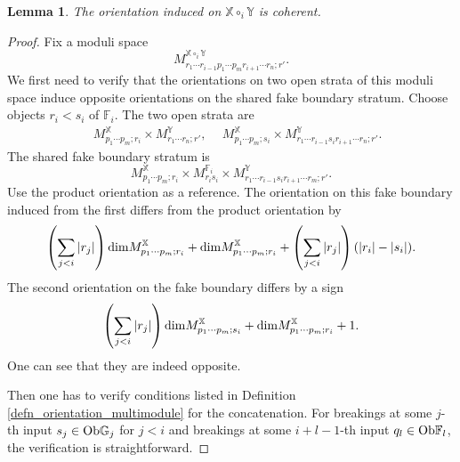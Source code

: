 \documentclass[reqno, 10pt]{amsart}
\numberwithin{equation}{section}
\numberwithin{equation}{section}
\newtheorem{lemma}[thm]{Lemma}
\theoremstyle{definition}
\theoremstyle{remark}
\newcommand{\beqn}{\begin{equation*}}
\newcommand{\eeqn}{\end{equation*}}
\newcommand{\mb}{\mathbb}
\begin{document}
\begin{lemma}\label{lemma_concatenation_orientation}
The orientation induced on ${\mb X}\circ_i {\mb Y}$ is coherent.
\end{lemma}

\begin{proof}
Fix a moduli space
\beqn
M_{r_1 \cdots r_{i-1} p_1 \cdots p_m r_{i+1} \cdots r_n; r'}^{{\mb X}\circ_i {\mb Y}}.
\eeqn
We first need to verify that the orientations on two open strata of this moduli space induce opposite orientations on the shared fake boundary stratum. Choose objects $r_i < s_i$ of ${\mb F}_i$. The two open strata are
\begin{align}
&\ M_{p_1 \cdots p_m; r_i}^{\mb X}\times M_{r_1 \cdots r_n; r'}^{\mb Y},\ &\ M_{p_1 \cdots p_m; s_i}^{\mb X}\times M_{r_1 \cdots r_{i-1} s_i r_{i+1} \cdots r_n; r'}^{\mb Y}.
\end{align}
The shared fake boundary stratum is 
\beqn
M_{p_1 \cdots p_m; r_i}^{\mb X} \times M_{r_i s_i}^{{\mb F}_i} \times M_{r_1 \cdots r_{i-1} s_i r_{i+1} \cdots r_m; r'}^{\mb Y}.
\eeqn
Use the product orientation as a reference. The orientation on this fake boundary induced from the first differs from the product orientation by 
\beqn
\left( \sum_{j<i}|r_j|\right) {\rm dim} M_{p_1 \cdots p_m; r_i}^{\mb X} + {\rm dim} M_{p_1 \cdots p_m; r_i}^{\mb X} + \left( \sum_{j<i} |r_j| \right) (|r_i| - |s_i|).
\eeqn
The second orientation on the fake boundary differs by a sign
\beqn
\left( \sum_{j<i} |r_j| \right)  {\rm dim} M_{p_1 \cdots p_m; s_i}^{\mb X} + {\rm dim} M_{p_1 \cdots p_m; r_i}^{\mb X} + 1.
\eeqn
One can see that they are indeed opposite.

Then one has to verify conditions listed in Definition \ref{defn_orientation_multimodule} for the concatenation. For breakings at some $j$-th input $s_j \in {\rm Ob} {\mb G}_j$ for $j<i$ and breakings at some $i+l-1$-th input $q_l \in {\rm Ob} {\mb F}_l$, the verification is straightforward. 

\end{proof}
\end{document}
